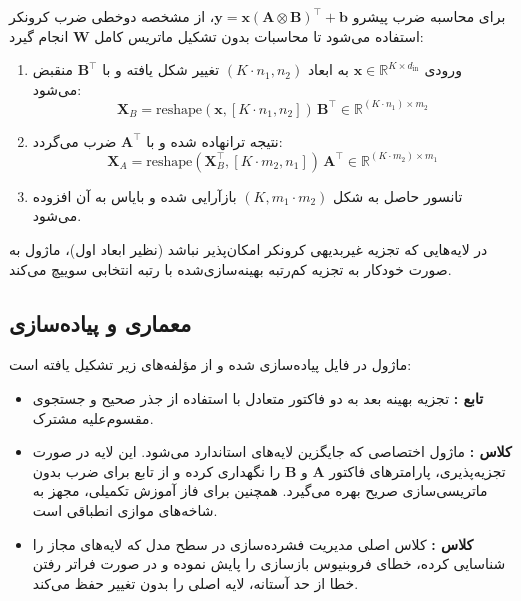 برای محاسبه ضرب پیشرو $\mathbf{y} = \mathbf{x} (\mathbf{A} \otimes \mathbf{B})^\top + \mathbf{b}$، از مشخصه دوخطی ضرب کرونکر استفاده می‌شود تا محاسبات بدون تشکیل ماتریس کامل $\mathbf{W}$ انجام گیرد:
\begin{enumerate}
    \item ورودی $\mathbf{x} \in \mathbb{R}^{K \times d_{\text{in}}}$ به ابعاد $(K \cdot n_1, n_2)$ تغییر شکل یافته و با $\mathbf{B}^\top$ منقبض می‌شود:
    \begin{equation}
    \mathbf{X}_B = \text{reshape}(\mathbf{x}, [K \cdot n_1, n_2]) \, \mathbf{B}^\top \in \mathbb{R}^{(K \cdot n_1) \times m_2}
    \end{equation}
    \item نتیجه ترانهاده شده و با $\mathbf{A}^\top$ ضرب می‌گردد:
    \begin{equation}
    \mathbf{X}_A = \text{reshape}(\mathbf{X}_B^\top, [K \cdot m_2, n_1]) \, \mathbf{A}^\top \in \mathbb{R}^{(K \cdot m_2) \times m_1}
    \end{equation}
    \item تانسور حاصل به شکل $(K, m_1 \cdot m_2)$ بازآرایی شده و بایاس به آن افزوده می‌شود.
\end{enumerate}

در لایه‌هایی که تجزیه غیربدیهی کرونکر امکان‌پذیر نباشد (نظیر ابعاد اول)، ماژول به صورت خودکار به تجزیه کم‌رتبه بهینه‌سازی‌شده  با رتبه انتخابی سوییچ می‌کند.

\subsection{معماری و پیاده‌سازی}
ماژول در فایل  پیاده‌سازی شده و از مؤلفه‌های زیر تشکیل یافته است:
\begin{itemize}
    \item \textbf{تابع :} تجزیه بهینه بعد به دو فاکتور متعادل با استفاده از جذر صحیح و جستجوی مقسوم‌علیه مشترک.
    \item \textbf{کلاس :} ماژول اختصاصی  که جایگزین لایه‌های استاندارد می‌شود. این لایه در صورت تجزیه‌پذیری، پارامترهای فاکتور $\mathbf{A}$ و $\mathbf{B}$ را نگهداری کرده و از تابع  برای ضرب بدون ماتریسی‌سازی صریح بهره می‌گیرد. همچنین برای فاز آموزش تکمیلی، مجهز به شاخه‌های موازی انطباقی  است.
    \item \textbf{کلاس :} کلاس اصلی مدیریت فشرده‌سازی در سطح مدل که لایه‌های مجاز را شناسایی کرده، خطای فروبنیوس بازسازی را پایش نموده و در صورت فراتر رفتن خطا از حد آستانه، لایه اصلی را بدون تغییر حفظ می‌کند.
\end{itemize}

